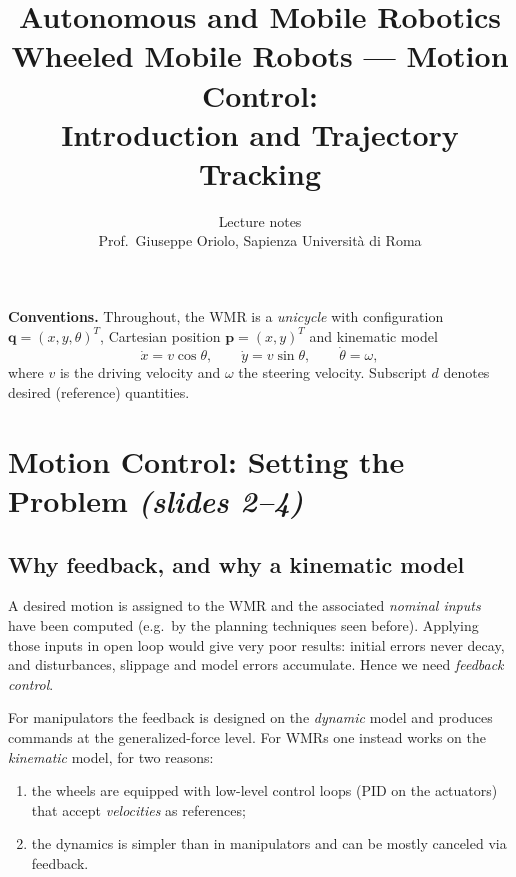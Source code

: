 \documentclass[11pt,a4paper]{article}
\title{\textbf{Autonomous and Mobile Robotics}\\[2mm]
\large Wheeled Mobile Robots --- Motion Control:\\ Introduction and Trajectory Tracking}
\author{Lecture notes\\ \small Prof.\ Giuseppe Oriolo, Sapienza Universit\`a di Roma}
\date{}
\newcommand{\vect}[1]{\bm{#1}}
\theoremstyle{plain}
\theoremstyle{definition}
\theoremstyle{remark}
\begin{document}
\maketitle
\tableofcontents
\bigskip

\noindent\textbf{Conventions.} Throughout, the WMR is a \emph{unicycle} with configuration $\vect q=(x,y,\theta)^T$, Cartesian position $\vect p=(x,y)^T$ and kinematic model
\begin{equation}\label{eq:unicycle}
\dot x=v\cos\theta,\qquad \dot y=v\sin\theta,\qquad \dot\theta=\omega,
\end{equation}
where $v$ is the driving velocity and $\omega$ the steering velocity. Subscript $d$ denotes desired (reference) quantities.

\section{Motion Control: Setting the Problem \texorpdfstring{\emph{(slides 2--4)}}{(slides 2--4)}}

\subsection{Why feedback, and why a kinematic model}

A desired motion is assigned to the WMR and the associated \emph{nominal inputs} have been computed (e.g.\ by the planning techniques seen before). Applying those inputs in open loop would give very poor results: initial errors never decay, and disturbances, slippage and model errors accumulate. Hence we need \emph{feedback control}.

For manipulators the feedback is designed on the \emph{dynamic} model and produces commands at the generalized-force level. For WMRs one instead works on the \emph{kinematic} model, for two reasons:
\begin{enumerate}[label=(\arabic*),nosep]
\item the wheels are equipped with low-level control loops (PID on the actuators) that accept \emph{velocities} as references;
\item the dynamics is simpler than in manipulators and can be mostly canceled via feedback.
\end{enumerate}
\end{document}
